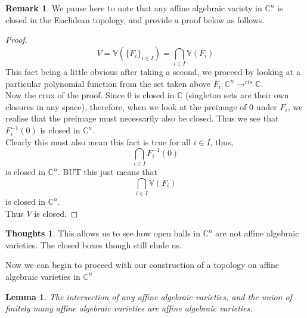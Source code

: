 \documentclass[12pt]{book}
\newtheorem{lem}[thm]{Lemma}
\theoremstyle{definition}
\newtheorem*{huh}{Thoughts}
\newtheorem*{rem}{Remark}
\begin{document}
\begin{rem}
    We pause here to note that any affine algebraic variety in $\mathbb{C}^n$ is closed in the Euclidean topology, and provide a proof below as follows.
    \begin{proof}
        $$V = \mathbb{V}(\{F_i\}_{i \in I}) = \bigcap_{i \in I} \mathbb{V}(F_i)$$
        This fact being a little obvious after taking a second, we proceed by looking at a particular polynomial function from the set taken above $F_i: \mathbb{C}^n \to^{cts} \mathbb{C}$.\\
        Now the crux of the proof. Since $0$ is closed in $\mathbb{C}$ (singleton sets are their own closures in any space), therefore, when we look at the preimage of $0$ under $F_i$, we realise that the preimage must necessarily also be closed. Thus we see that $F_i^{-1} (0)$ is closed in $\mathbb{C}^n$.\\
        Clearly this must also mean this fact is true for all $i \in I$, thus, 
        $$\bigcap_{i \in I} F_i^{-1} (0) $$
        is closed in $\mathbb{C}^n$. BUT this just means that  $$\bigcap_{i \in I} \mathbb{V}(F_i) $$
        is closed in $\mathbb{C}^n$.\\
        Thus $V$ is closed.
    \end{proof}
\end{rem}
\begin{huh}
    This allows us to see how open balls in $\mathbb{C}^n$ are not affine algebraic varieties. The closed boxes though still elude us.
\end{huh}
Now we can begin to proceed with our construction of a topology on affine algebraic varieties in $\mathbb{C}^n$
\begin{lem}
    The intersection of any affine algebraic varieties, and the union of finitely many affine algebraic varieties are affine algebraic varieties.
\end{lem}
\end{document}
